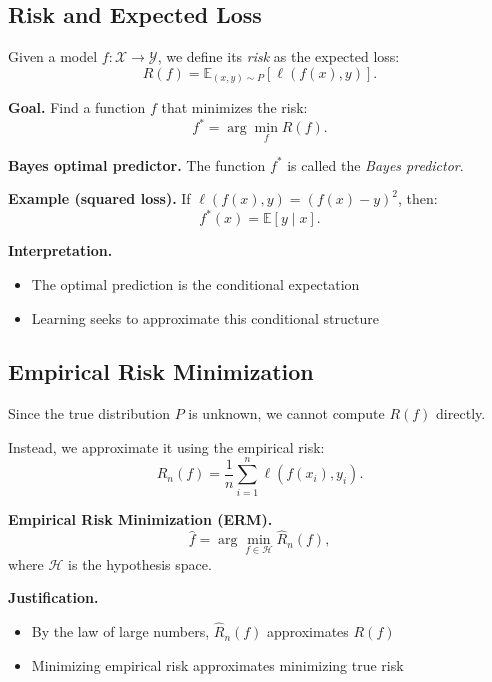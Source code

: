 \subsection{Risk and Expected Loss}

Given a model $f : \mathcal{X} \to \mathcal{Y}$, we define its \emph{risk} as the expected loss:
\[
R(f) = \mathbb{E}_{(x,y) \sim P} \left[ \ell(f(x), y) \right].
\]

\medskip

\noindent
\textbf{Goal.}  
Find a function $f$ that minimizes the risk:
\[
f^* = \arg\min_f R(f).
\]

\medskip

\noindent
\textbf{Bayes optimal predictor.}  
The function $f^*$ is called the \emph{Bayes predictor}.

\medskip

\noindent
\textbf{Example (squared loss).}  
If $\ell(f(x), y) = (f(x) - y)^2$, then:
\[
f^*(x) = \mathbb{E}[y \mid x].
\]

\medskip

\noindent
\textbf{Interpretation.}
\begin{itemize}
    \item The optimal prediction is the conditional expectation
    \item Learning seeks to approximate this conditional structure
\end{itemize}

\subsection{Empirical Risk Minimization}

Since the true distribution $P$ is unknown, we cannot compute $R(f)$ directly.

\medskip

\noindent
Instead, we approximate it using the empirical risk:
\[
\hat{R}_n(f) = \frac{1}{n} \sum_{i=1}^n \ell(f(x_i), y_i).
\]

\medskip

\noindent
\textbf{Empirical Risk Minimization (ERM).}
\[
\hat{f} = \arg\min_{f \in \mathcal{H}} \hat{R}_n(f),
\]
where $\mathcal{H}$ is the hypothesis space.

\medskip

\noindent
\textbf{Justification.}
\begin{itemize}
    \item By the law of large numbers, $\hat{R}_n(f)$ approximates $R(f)$
    \item Minimizing empirical risk approximates minimizing true risk
\end{itemize}

